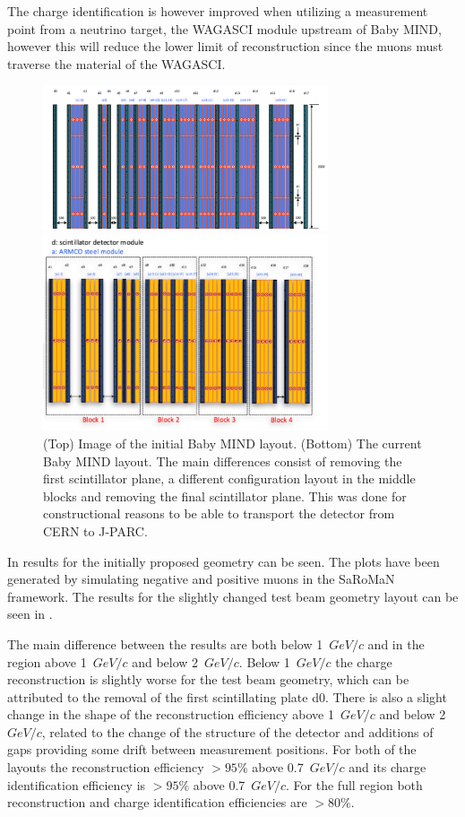 The charge identification is however improved when utilizing a measurement point from a neutrino target, the WAGASCI module upstream of Baby MIND, however this will reduce the lower limit of reconstruction since the muons must traverse the material of the WAGASCI. 

\begin{figure}[h!]
\centering
\includegraphics[width=0.75\textwidth]{figures/oldStudies/oldMIND.png}

\includegraphics[width=0.75\textwidth]{figures/MIND.jpeg}
\caption{(Top) Image of the initial Baby MIND layout. (Bottom) The current Baby MIND layout. The main differences consist of removing the first scintillator plane, a different configuration layout in the middle blocks and removing the final scintillator plane. This was done for constructional reasons to be able to transport the detector from CERN to J-PARC.}
\label{fig:oldMIND}
\end{figure}

In  results for the initially proposed geometry can be seen. The plots have been generated by simulating negative and positive muons in the SaRoMaN framework. The results for the slightly changed test beam geometry layout can be seen in  . 

The main difference between the results are both below 1~$GeV/c$ and in the region above 1~$GeV/c$ and below 2~$GeV/c$. Below 1~$GeV/c$ the charge reconstruction is slightly worse for the test beam geometry, which can be attributed to the removal of the first scintillating plate d0. There is also a slight change in the shape of the reconstruction efficiency above 1~$GeV/c$ and below 2~$GeV/c$, related to the change of the structure of the detector and additions of gaps providing some drift between measurement positions. For both of the layouts the reconstruction efficiency $> 95\%$ above 0.7~$GeV/c$ and its charge identification efficiency is $> 95\%$ above 0.7~$GeV/c$. For the full region both reconstruction and charge identification efficiencies are $> 80\% $. 

